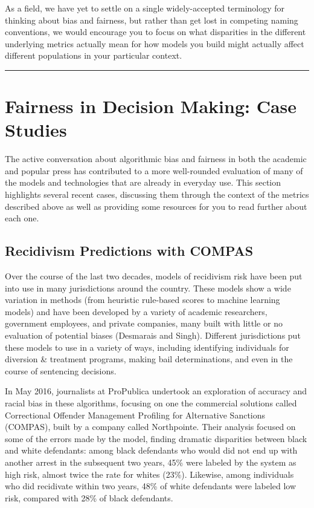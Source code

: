 \documentclass[]{krantz}
\begin{document}
As a field, we have yet to settle on a single widely-accepted
terminology for thinking about bias and fairness, but rather than get
lost in competing naming conventions, we would encourage you to focus on
what disparities in the different underlying metrics actually mean for
how models you build might actually affect different populations in your
particular context.

\begin{center}\rule{0.5\linewidth}{\linethickness}\end{center}

\section{Fairness in Decision Making: Case
Studies}\label{fairness-in-decision-making-case-studies}

The active conversation about algorithmic bias and fairness in both the
academic and popular press has contributed to a more well-rounded
evaluation of many of the models and technologies that are already in
everyday use. This section highlights several recent cases, discussing
them through the context of the metrics described above as well as
providing some resources for you to read further about each one.

\hypertarget{sec:compascase}{\subsection{Recidivism Predictions with
COMPAS}\label{sec:compascase}}

Over the course of the last two decades, models of recidivism risk have
been put into use in many jurisdictions around the country. These models
show a wide variation in methods (from heuristic rule-based scores to
machine learning models) and have been developed by a variety of
academic researchers, government employees, and private companies, many
built with little or no evaluation of potential biases (Desmarais and
Singh). Different jurisdictions put these models to use in a variety of
ways, including identifying individuals for diversion \& treatment
programs, making bail determinations, and even in the course of
sentencing decisions.

In May 2016, journalists at ProPublica undertook an exploration of
accuracy and racial bias in these algorithms, focusing on one the
commercial solutions called Correctional Offender Management Profiling
for Alternative Sanctions (COMPAS), built by a company called
Northpointe. Their analysis focused on some of the errors made by the
model, finding dramatic disparities between black and white defendants:
among black defendants who would did not end up with another arrest in
the subsequent two years, 45\% were labeled by the system as high risk,
almost twice the rate for whites (23\%). Likewise, among individuals who
did recidivate within two years, 48\% of white defendants were labeled
low risk, compared with 28\% of black defendants.
\end{document}
